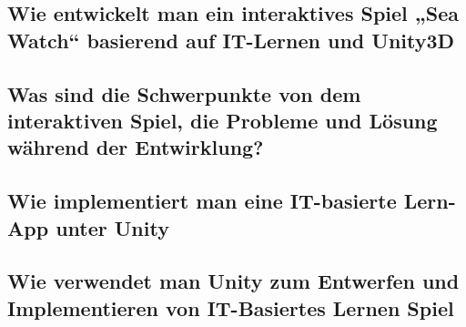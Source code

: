 \documentclass{article}
\begin{document}
\subsection{Wie entwickelt man ein interaktives Spiel „Sea Watch“ basierend auf IT-Lernen und Unity3D}

\subsection{Was sind die Schwerpunkte von dem interaktiven Spiel, die Probleme und Lösung während der Entwirklung? }

\subsection{Wie implementiert man eine IT-basierte Lern-App unter Unity}
\subsection{Wie verwendet man Unity zum Entwerfen und Implementieren von IT-Basiertes Lernen Spiel}
\end{document}
